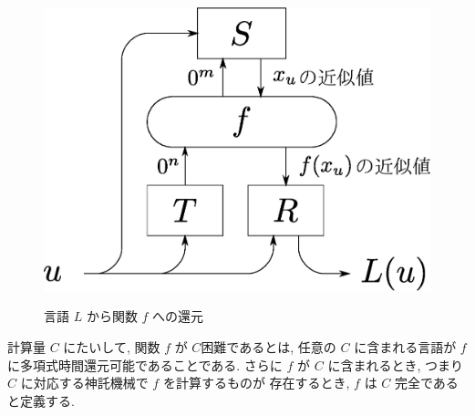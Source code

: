  \begin{figure}
  \begin{center}
  \label{fig:reduction}
  \includegraphics[height=0.2\textheight]{image/reduction.eps}
  \caption{言語 $L$ から関数 $f$ への還元}
  \end{center}
 \end{figure}

 計算量 $C$ にたいして, 関数 $f$ が $C$困難であるとは,
 任意の $C$ に含まれる言語が $f$ に多項式時間還元可能であることである.
 さらに $f$ が $C$ に含まれるとき, つまり $C$ に対応する神託機械で $f$ を計算するものが
 存在するとき, $f$ は $C$ 完全であると定義する.
 
